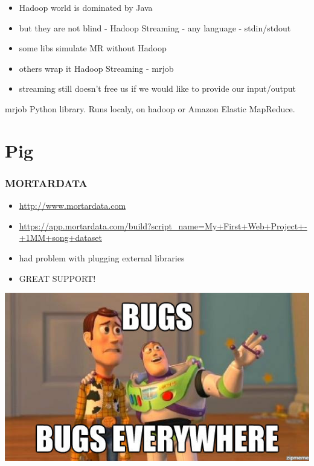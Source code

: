 \documentclass{beamer}
\begin{document}
\begin{frame}
    \begin{itemize}
        \item Hadoop world is dominated by Java
            \pause
        \item but they are not blind - Hadoop Streaming - any language - stdin/stdout
        \item some libs simulate MR without Hadoop
        \item others wrap it Hadoop Streaming - mrjob
        \item streaming still doesn't free us if we would like to provide our input/output
    \end{itemize}
    \begin{block}{mrjob}
    Python library. Runs localy, on hadoop or Amazon Elastic MapReduce.
    \end{block}
\end{frame}


\begin{frame}
    
\end{frame}


\section{Pig}

\begin{frame}
    \frametitle{MORTARDATA}
    \begin{itemize}
            \item \url{http://www.mortardata.com}
            \item \url{https://app.mortardata.com/build?script_name=My+First+Web+Project+-+1MM+song+dataset}
            \item had problem with plugging external libraries
            \item GREAT SUPPORT!
    \end{itemize}

\end{frame}



\begin{frame}
\begin{center}

\includegraphics[scale=0.5]{BUGSBUGSEVERYWHERE.jpg} 

\end{center}

\end{frame}
\end{document}
